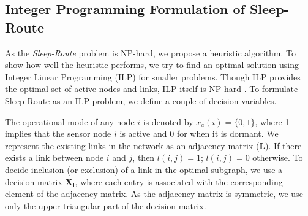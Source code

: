 \documentclass[conference]{IEEEtran}
\begin{document}
\subsection{Integer Programming Formulation of Sleep-Route}
As the \emph{Sleep-Route} problem is NP-hard, we propose a heuristic algorithm. To show how well the heuristic performs, we try to find an optimal solution using Integer Linear Programming (ILP) for smaller problems. Though ILP provides the optimal set of active nodes and links, ILP itself is NP-hard \cite{karp1972reducibility}. To formulate Sleep-Route as an ILP problem, we define a couple of decision variables. 

The operational mode of any node $i$ is denoted by $x_{a}(i) =\{0,1\}$, where 1 implies that the sensor node $i$ is active and 0 for when it is dormant. We represent the existing links in the network as an adjacency matrix ($\boldsymbol{L}$). If there exists a link between node $i$ and $j$, then $l(i,j)=1$; $l(i,j)=0$ otherwise. To decide inclusion (or exclusion) of a link in the optimal subgraph, we use a decision matrix $\boldsymbol{X_{l}}$, where each entry is associated with the corresponding element of the adjacency matrix. As the adjacency matrix is symmetric, we use only the upper triangular part of the decision matrix.
\end{document}
